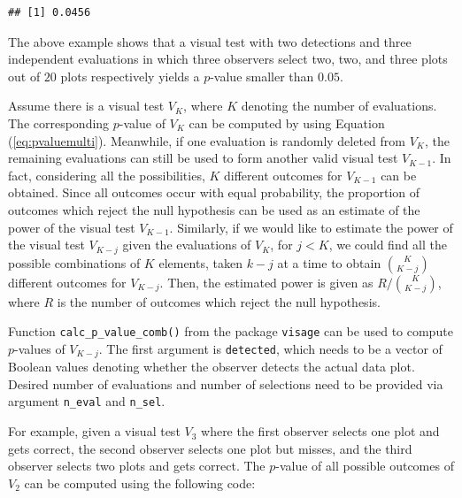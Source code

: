 \documentclass{monashthesis}
\theoremstyle{definition}
\theoremstyle{definition}
\theoremstyle{definition}
\theoremstyle{definition}
\theoremstyle{remark}
\begin{document}
\begin{Shaded}
\begin{Highlighting}[]
\NormalTok{(} \NormalTok{, } \NormalTok{, } \NormalTok{(}\NormalTok{, }\NormalTok{, }\NormalTok{), } \NormalTok{)}
\end{Highlighting}
\end{Shaded}

\begin{verbatim}
## [1] 0.0456
\end{verbatim}

The above example shows that a visual test with two detections and three independent evaluations in which three observers select two, two, and three plots out of \(20\) plots respectively yields a \(p\)-value smaller than \(0.05\).

Assume there is a visual test \(V_K\), where \(K\) denoting the number of evaluations. The corresponding \(p\)-value of \(V_K\) can be computed by using Equation (\ref{eq:pvaluemulti}). Meanwhile, if one evaluation is randomly deleted from \(V_K\), the remaining evaluations can still be used to form another valid visual test \(V_{K-1}\). In fact, considering all the possibilities, \(K\) different outcomes for \(V_{K-1}\) can be obtained. Since all outcomes occur with equal probability, the proportion of outcomes which reject the null hypothesis can be used as an estimate of the power of the visual test \(V_{K-1}\). Similarly, if we would like to estimate the power of the visual test \(V_{K-j}\) given the evaluations of \(V_{K}\), for \(j < K\), we could find all the possible combinations of \(K\) elements, taken \(k-j\) at a time to obtain \(K\choose{K-j}\) different outcomes for \(V_{K-j}\). Then, the estimated power is given as \(R/{K\choose{K-j}}\), where \(R\) is the number of outcomes which reject the null hypothesis.

Function \texttt{calc\_p\_value\_comb()} from the package \texttt{visage} can be used to compute \(p\)-values of \(V_{K-j}\). The first argument is \texttt{detected}, which needs to be a vector of Boolean values denoting whether the observer detects the actual data plot. Desired number of evaluations and number of selections need to be provided via argument \texttt{n\_eval} and \texttt{n\_sel}.

For example, given a visual test \(V_3\) where the first observer selects one plot and gets correct, the second observer selects one plot but misses, and the third observer selects two plots and gets correct. The \(p\)-value of all possible outcomes of \(V_2\) can be computed using the following code:
\end{document}

